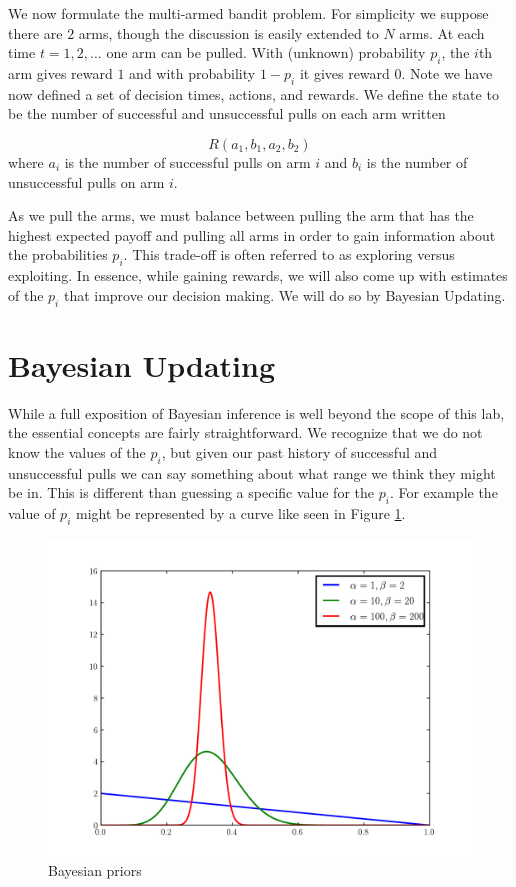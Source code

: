 We now formulate the multi-armed bandit problem.  For simplicity we suppose there are $2$ arms, though the discussion is easily extended to $N$ arms.  At each time $t= 1,2,\ldots$ one arm can be pulled.  With (unknown) probability $p_i$, the $i$th arm gives reward $1$ and with probability $1-p_i$ it gives reward $0$.  Note we have now defined a set of decision times, actions, and rewards.  We define the state to be the number of successful and unsuccessful pulls on each arm written

\begin{equation}\label{state}
R(a_1,b_1,a_2,b_2)
\end{equation}
\noindent
where $a_i$ is the number of successful pulls on arm $i$ and $b_i$ is the number of unsuccessful pulls on arm $i$.

As we pull the arms, we must balance between pulling the arm that has the highest expected payoff and pulling all arms in order to gain information about the probabilities $p_i$.  This trade-off is often referred to as exploring versus exploiting.  In essence, while gaining rewards, we will also come up with estimates of the $p_i$ that improve our decision making.  We will do so by Bayesian Updating.

\section*{Bayesian Updating}
While a full exposition of Bayesian inference is well beyond the scope of this lab, the essential concepts are fairly straightforward.  We recognize that we do not know the values of the $p_i$, but given our past history of successful and unsuccessful pulls we can say something about what range we think they might be in. This is different than guessing a specific value for the $p_i$.  For example the value of $p_i$ might be represented by a curve like seen in Figure \ref{fig:priors}.

\begin{figure}\label{fig:priors}
\begin{center}
        \includegraphics[scale=0.4]{./Algorithms/MarkDecProc/priors.pdf}
        \caption{Bayesian priors}
\end{center}
\end{figure}

